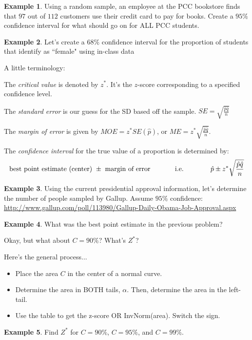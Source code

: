 \documentclass[12pt]{amsart}
\theoremstyle{definition}
\newtheorem{ex}{Example}
\begin{document}
 \begin{ex} Using a random sample, an employee at the PCC bookstore finds that $97$ out of $112$ customers use their credit card to pay for books. Create a $95\%$ confidence interval for what should go on for ALL PCC students.\end{ex}
 \vfill
 \begin{ex} Let's create a $68\%$ confidence interval for the proportion of students that identify as ``female" using in-class data\end{ex}
 \vfill
 \newpage
 A little terminology:
 \begin{framed}
 	The \emph{critical value} is denoted by $z^*$. It's the $z$-score corresponding to a specified confidence level.
 	
 	The \emph{standard error} is our guess for the SD based off the sample. $SE=\sqrt{\frac{\hat{p}\hat{q}}{n}}$
 	
 	The \emph{margin of error} is given by $MOE=z^*SE(\hat{p})$, or $ME=z^*\sqrt{\frac{\hat{p}\hat{q}}{n}}$.
 	
 	The \emph{confidence interval} for the true value of a proportion is determined by:
 	\[
 	\textrm{best point estimate (center)}\ \pm\ \textrm{margin of error} \hspace{0.5in} \textrm{i.e.}\ \hspace{0.5in} \hat{p}\pm z^*\sqrt{\frac{\hat{p}\hat{q}}{n}}
 	\]	
 \end{framed}
 
 \begin{ex} Using the current presidential approval information, let's determine the number of people sampled by Gallup. Assume $95\%$ confidence: \url{http://www.gallup.com/poll/113980/Gallup-Daily-Obama-Job-Approval.aspx}\end{ex}
 \vfill
 \begin{ex} What was the best point estimate in the previous problem?\end{ex}
 \vspace{0.2in}

\noindent Okay, but what about $C=90\%$? What's $Z^*$?
\vfill

\begin{framed} Here's the general process...
\begin{itemize}
	\item Place the area $C$ in the center of a normal curve.
	\item Determine the area in BOTH tails, $\alpha$. Then, determine the area in the left-tail.
	\item Use the table to get the z-score OR InvNorm(area). Switch the sign.
\end{itemize}\end{framed}

\begin{ex} Find $Z^*$ for $C=90\%$, $C=95\%$, and $C=99\%$.\end{ex}
\vfill
\end{document}
